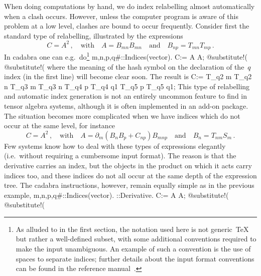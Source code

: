\documentclass{elsart}
\newenvironment{screen}{\vspace{1ex}\Verbatim}{\endVerbatim\vspace{1ex}}
\begin{document}
When doing computations by hand, we do index relabelling almost
automatically when a clash occurs. However, unless the computer
program is aware of this problem at a low level, clashes are bound to
occur frequently. Consider first the standard type of relabelling,
illustrated by the expressions
\begin{equation}
C = A^2\,,\quad \text{with}\quad A = B_{m n} B_{m n}\quad\text{and}\quad
B_{n p} = T_{m n} T_{m p}\,.
\end{equation}
In cadabra one can e.g.~do\footnote{As alluded to in the first
  section, the notation used here is not generic~\TeX{} but rather a
  well-defined subset, with some additional conventions required to
  make the input unambiguous. An example of such a convention is the
  use of spaces to separate indices; further details about the input
  format conventions can be found in the reference
  manual~\cite{kas_cdb}.}
\begin{screen}
{m,n,p,q#}::Indices(vector).
C:= A A;
@substitute!(%
@substitute!(%
\end{screen}
where the meaning of the hash symbol on the declaration of the~$q$
index (in the first line) will become clear soon. The result is
\begin{screen}
C:= T_{q2 m} T_{q2 n} T_{q3 m} T_{q3 n} T_{q4 p} T_{q4 q1} T_{q5 p} T_{q5 q1};
\end{screen}
This type of relabelling and automatic index generation is not an
entirely uncommon feature to find in tensor algebra systems, although
it is often implemented in an add-on package. The situation becomes
more complicated when we have indices which do not occur at the same
level, for instance
\begin{equation}
  C = A^2\,,\quad \text{with} \quad
  A = \partial_m (B_n B_p + C_{n p} ) B_{m n p}\quad\text{and}\quad
  B_n = T_{n m} S_{m}\,.
\end{equation}
Few systems know how to deal with these types of expressions
elegantly (i.e.~without requiring a cumbersome input format).  The
reason is that the derivative carries an index, but the objects in the
product on which it acts carry indices too, and these indices do not
all occur at the same depth of the expression tree. The cadabra
instructions, however, remain equally simple as in the previous example,
\begin{screen}
{m,n,p,q#}::Indices(vector).
\partial{#}::Derivative.
C:= A A;
@substitute!(%
@substitute!(%
\end{screen}
\end{document}
